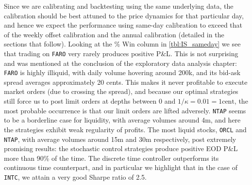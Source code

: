 Since we are calibrating and backtesting using the same underlying data, the calibration should be best attuned to the price dynamics for that particular day, and hence we expect the performance using same-day calibration to exceed that of the weekly offset calibration and the annual calibration (detailed in the sections that follow). Looking at the \% Win column in \autoref{tbl:IS_sameday} we see that trading on \texttt{FARO} very rarely produces positive P\&L. This is not surprising and was mentioned at the conclusion of the exploratory data analysis chapter: \texttt{FARO} is highly illiquid, with daily volume hovering around 200k, and its bid-ask spread averages approximately 20 cents. This makes it never profitable to execute market orders (due to crossing the spread), and because our optimal strategies still force us to post limit orders at depths between 0 and $1/\kappa = 0.01 = 1\text{cent}$, the most probable occurrence is that our limit orders are lifted adversely. \texttt{NTAP} seems to be a borderline case for liquidity, with average volumes around 4m, and here the strategies exhibit weak regularity of profits. The most liquid stocks, \texttt{ORCL} and \texttt{NTAP}, with average volumes around 15m and 30m respectively, post extremely promising results: the stochastic control strategies produce positive EOD P\&L more than 90\% of the time. The discrete time controller outperforms its continuous time counterpart, and in particular we highlight that in the case of \texttt{INTC}, we attain a very good Sharpe ratio of 2.5.

